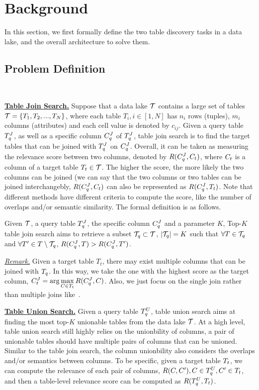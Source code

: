 \section{Background} 
In this section, we first formally define the two table discovery tasks in a data lake, and the overall architecture to solve them.

\subsection{Problem Definition}~\label{subsec:def}


\noindent\textbf{\underline{Table Join Search.}}
Suppose that a data lake $\mathcal{T}$ contains a large set of tables $\mathcal{T}=\{T_1, T_2, ..., T_N\}$, where each table $T_i, i \in [1,N]$ has $n_i$ rows (tuples), $m_i$ columns (attributes) and each cell value is denoted by $c_{ij}$.  Given a query table $T^J_q$, as well as a specific column $C^J_q$ of $T^J_q$, table join search is to find the target tables that can be joined with  $T^J_q$ on $C^J_q$.
%
Overall, it can be taken as measuring the relevance score between two columns, denoted by $R(C^J_q, C_t)$, where   $C_t$ is a column  of a target table $T_t \in \mathcal{T}$. The higher the score, the more likely the two columns can be joined (we can say that the two columns or two tables can be joined interchangebly, \ie $R(C^J_q, C_t)$  can also be represented as $R(C^J_q, T_t)$.
Note that different methods have different criteria to compute the score, like the number of overlaps and/or semantic similarity.
 The formal definition is as follows. 

\begin{definition}
	Given $\mathcal{T}$, a query table $T^J_q$, the specific column $C^J_q$ and a parameter $K$, Top-$K$ table join search aims to retrieve a subset $\mathcal{T}_q \subset \mathcal{T}$, $|\mathcal{T}_q|=K$ such that $\forall T \in \mathcal{T}_q$ and $\forall T' \in T \setminus \mathcal{T}_q$, $R(C^J_q, T)>R(C^J_q, T')$.
\end{definition}

\noindent \underline{\textit{Remark.}} Given a target table $T_t$, there may exist multiple columns that can be joined with $T_q$. In this way,  we  take the one with the highest score as the target column, \ie $C^J_t=\arg\max\limits_{C\in T_t} R(C^J_q, C)$. Also, we just focus on the single join rather than multiple joins like~\cite{}.

\noindent\textbf{\underline{Table Union Search.}} Given a query table $T^U_q$,  table union search aims at finding the most top-$K$ unionable tables from the data lake $\mathcal{T}$. At a high level,  table union search still highly relies on   the unionbility of  columns, \ie a pair of unionable tables should have multiple pairs of columns that can be unioned. Similar to the table join search, the column unionbility also considers the overlaps and/or semantics between columns. To be specific, given a target table $T_t$, we can compute the relevance of each pair of columns, \ie   $R(C, C'), C \in T^U_q, C' \in T_t$, and then a table-level relevance score can be computed as $R(T^U_q, T_t)$.


